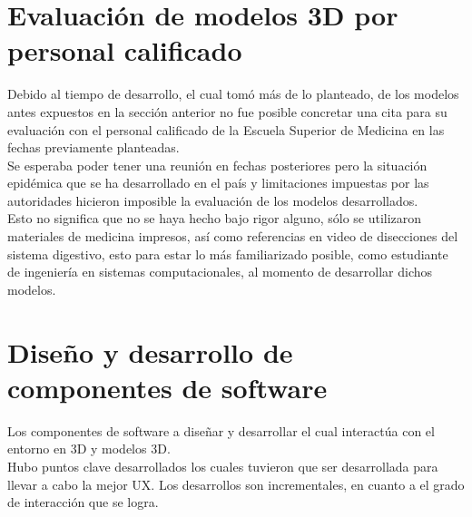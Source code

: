 \section{Evaluación de modelos 3D por personal calificado}
Debido al tiempo de desarrollo, el cual tomó más de lo planteado, de los modelos antes expuestos en la sección anterior no fue posible concretar una cita para su evaluación con el personal calificado  de la Escuela Superior de Medicina en las fechas previamente planteadas.\\

Se esperaba poder tener una reunión en fechas posteriores pero la situación epidémica que se ha desarrollado en el país y limitaciones impuestas por las autoridades hicieron imposible la evaluación de los modelos desarrollados.\\

Esto no significa que no se haya hecho bajo rigor alguno, sólo se utilizaron materiales de medicina impresos, así como referencias en video de disecciones del sistema digestivo, esto para estar lo más familiarizado posible, como estudiante de ingeniería en sistemas computacionales, al momento de desarrollar dichos modelos.\\

\section{Diseño y desarrollo de componentes de software}
Los componentes de software a diseñar y desarrollar el cual interactúa con el entorno en 3D y  modelos 3D.\\

Hubo puntos clave desarrollados los cuales tuvieron que ser desarrollada para llevar a cabo la mejor UX. Los desarrollos son incrementales, en cuanto a el grado de interacción que se logra.\\
 
